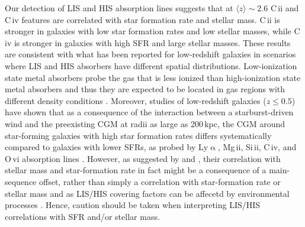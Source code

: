 \documentclass[longauth]{aa}
\begin{document}
Our detection of LIS and HIS absorption lines suggests that at $\langle
z \rangle \sim 2.6$ C\,{\sc ii} and C\,{\sc iv} features are correlated with
star formation rate and stellar mass. C\,{\sc ii} is stronger in galaxies
with low star formation rates and low stellar masses, while C\,{\sc iv} is
stronger in galaxies with high SFR and large stellar masses. These results
are consistent with what has been reported for low-redshift galaxies in
scenarios where LIS and HIS absorbers have different spatial distributions.
Low-ionization state metal absorbers probe the gas that is less ionized than
high-ionization state metal absorbers \citep{Nagao06} and thus they are
expected to be located in gas regions with different density
conditions \citep{Burchett16}. Moreover, studies of low-redshift galaxies
($z\leq0.5$) have shown that as a consequence of the interaction between a
starburst-driven wind and the preexisting CGM at radii as large as 200\,kpc,
the CGM around star-forming galaxies with high star formation rates differs
systematically compared to galaxies with lower SFRs, as probed  by
Ly$\upalpha$, Mg\,{\sc ii}, Si\,{\sc ii}, C\,{\sc iv}, and O\,{\sc vi}
absorption lines \citep{Tumlinson11a,Borthakur13,Lan14,Heckman17}. However,
as suggested by 
\cite{Cicone16} and \cite{Gatkine22}, their correlation with stellar mass and
star-formation rate in fact might be a consequence of a main-sequence
offset, rather than simply a correlation with star-formation rate or stellar
mass  and as LIS/HIS covering factors can be affecetd by environmental
processes  \citep{Dutta21}. Hence, caution should be taken when interpreting
LIS/HIS correlations with SFR and/or stellar mass.
\end{document}
